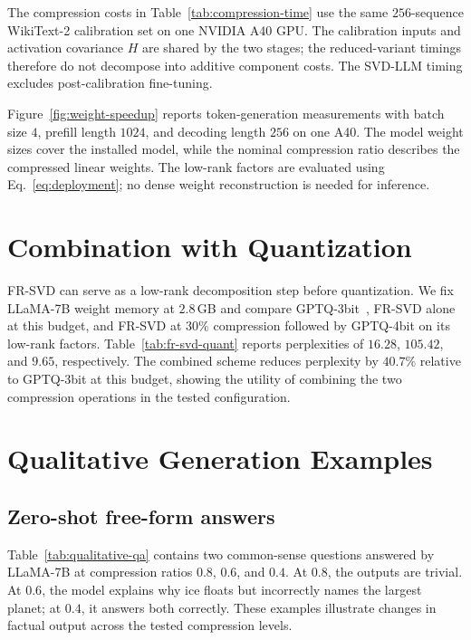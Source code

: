The compression costs in Table~\ref{tab:compression-time} use the same $256$-sequence WikiText-2 calibration set on one NVIDIA A40 GPU. The calibration inputs and activation covariance $H$ are shared by the two stages; the reduced-variant timings therefore do not decompose into additive component costs. The SVD-LLM timing excludes post-calibration fine-tuning.

Figure~\ref{fig:weight-speedup} reports token-generation measurements with batch size $4$, prefill length $1024$, and decoding length $256$ on one A40. The model weight sizes cover the installed model, while the nominal compression ratio describes the compressed linear weights. The low-rank factors are evaluated using Eq.~\eqref{eq:deployment}; no dense weight reconstruction is needed for inference.

\section{Combination with Quantization}\label{app:quantization}
FR-SVD can serve as a low-rank decomposition step before quantization. We fix LLaMA-7B weight memory at $2.8$\,GB and compare GPTQ-3bit~\citep{frantar2023gptq}, FR-SVD alone at this budget, and FR-SVD at $30\%$ compression followed by GPTQ-4bit on its low-rank factors. Table~\ref{tab:fr-svd-quant} reports perplexities of $16.28$, $105.42$, and $9.65$, respectively. The combined scheme reduces perplexity by $40.7\%$ relative to GPTQ-3bit at this budget, showing the utility of combining the two compression operations in the tested configuration.



\section{Qualitative Generation Examples}\label{app:qualitative}

\subsection{Zero-shot free-form answers}
Table~\ref{tab:qualitative-qa} contains two common-sense questions answered by LLaMA-7B at compression ratios $0.8$, $0.6$, and $0.4$. At $0.8$, the outputs are trivial. At $0.6$, the model explains why ice floats but incorrectly names the largest planet; at $0.4$, it answers both correctly. These examples illustrate changes in factual output across the tested compression levels.

